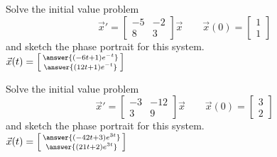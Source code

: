 \documentclass{ximera}
\begin{document}
\begin{exercise}
    Solve the initial value problem
    \[ 
        {\vec{x}}' = 
        \begin{bmatrix} 
            -5 & -2 \\ 
            8 & 3 
        \end{bmatrix} 
        \vec{x} \qquad \vec{x}(0) = 
        \begin{bmatrix} 
            1 \\ 
            1 
        \end{bmatrix} 
    \] 
    and sketch the phase portrait for this system.\\
    $\vec{x}(t) = \left[\begin{smallmatrix} \answer{(-6t+1)e^{-t}} \\ \answer{(12t + 1)e^{-t}} \end{smallmatrix}\right]$
\end{exercise}

\begin{exercise}
    Solve the initial value problem
    \[ 
        {\vec{x}}' = 
        \begin{bmatrix} 
            -3 & -12 \\ 
            3 & 9 
        \end{bmatrix}
        \vec{x} \qquad \vec{x}(0) = 
        \begin{bmatrix} 
            3 \\ 
            2  
        \end{bmatrix} 
    \] 
    and sketch the phase portrait for this system.\\
    $\vec{x}(t) = \left[\begin{smallmatrix} \answer{(-42t + 3)e^{3t}} \\ \answer{(21t + 2)e^{3t}} \end{smallmatrix}\right]$
\end{exercise}
\end{document}
